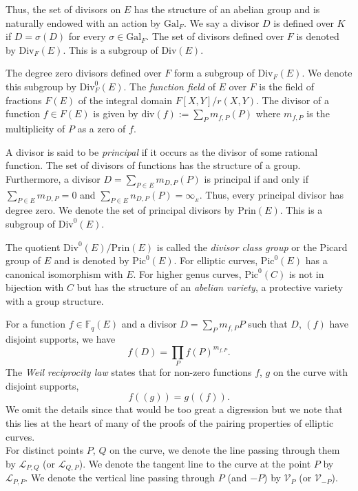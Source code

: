 \documentclass[a4paper, 11pt]{scrreprt}
\numberwithin{equation}{section}
\newcommand{\bFq}{\mathbb{F}_q}
\newcommand{\pl}{\prod\limits}
\newcommand{\slim}{\sum\limits}
\newcommand{\absf}{\mathrm{Gal}_F}
\newcommand{\divv}{\mathrm{div}}
\newcommand{\mc}{\mathcal}
\newcommand{\mr}{\mathrm}
\newcommand{\vs}{\vspace{-2mm}}
\theoremstyle{plain}
\begin{document}
Thus, the set of divisors on $E$ has the structure of an abelian group and is naturally endowed with an action by $\absf$. We say a divisor $D$ is defined over $K$ if $D = \sigma(D)$ for every $\sigma\in \absf$. The set of divisors defined over $F$ is denoted by $\mr{Div}_F(E)$. This is a subgroup of $\mr{Div}(E)$.

The degree zero divisors defined over $F$ form a subgroup of $\mr{Div}_F(E)$. We denote this subgroup by $\mr{Div}_F^0(E)$. The \textit{function field} of $E$ over $F$ is the field of fractions $F(E)$ of the integral domain $F[X,Y]/r(X,Y).$ The divisor of a function $f\in F(E)$ is given by $\divv(f):= \slim_{P} m_{f,P}(P)$ where $m_{f,P}$ is the multiplicity of $P$ as a zero of $f$. 

A divisor is said to be \textit{principal} if it occurs as the divisor of some rational function. The set of divisors of functions has the structure of a group. Furthermore, a divisor $D= \slim_{P\in E}m_{D,P}(P)$ is principal if and only if $\slim_{P\in E}m_{D,P} = 0$ and $\slim_{P\in E}n_{D,P}(P) = \infty_{_E}$. Thus, every principal divisor has degree zero. We denote the set of principal divisors by $\mr{Prin}(E)$. This is a subgroup of $\mr{Div}^0(E)$.

The quotient $\mr{Div}^0(E)/\mr{Prin}(E)$ is called the \textit{divisor class group} or the Picard group of $E$ and is denoted by $\mr{Pic}^0(E)$. For elliptic curves,  $\mr{Pic}^0(E)$ has a canonical isomorphism with $E$. For higher genus curves, $\mr{Pic}^0(C)$ is not in bijection with $C$ but has the structure of an \textit{abelian variety}, a protective variety with a group structure.  


For a function $f\in \bFq(E)$ and a divisor $D= \slim_{P} m_{f,P}P$ such that $D$, $(f)$ have disjoint supports, we have \vs $$f(D) = \pl_{P} f(P)^{m_{f,P}} .$$ The \textit{Weil reciprocity law} states that for non-zero functions $f$, $g$ on the curve with disjoint supports, \vs $$f((g)) = g((f)) .$$ We omit the details since that would be too great a digression but we note that this lies at the heart of many of the proofs of the pairing properties of elliptic curves.\\

For distinct points $P$, $Q$ on the curve, we denote the line passing through them by $\mc{L}_{P,Q}$ (or $\mc{L}_{Q, P}$). We denote the tangent line to the curve at the point $P$ by $\mc{L}_{P, P}$. We denote the vertical line passing through $P$ (and $-P$) by $\mc{V}_P$ (or $\mc{V}_{-P}$). \\
\end{document}
